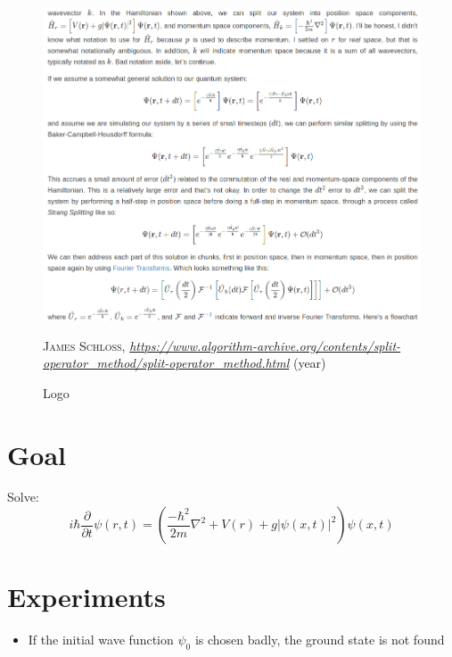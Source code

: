 \begin{figure}[H]
    \centering
    \includegraphics[width=1.0\textwidth]{IMAGE/strang_splitting.png}\\
    \caption{Logo}
    \textsc{James Schloss},
    \emph{            \url{https://www.algorithm-archive.org/contents/split-operator_method/split-operator_method.html}
    } (year)
    \label{fig:strang_splitting}
\end{figure}

\section{Goal}
Solve:
    \begin{equation}
        i \hbar \frac{\partial}{\partial t} \psi(r,t) = \left(\frac{-\hbar^{2}}{2 m} \nabla^{2}
                                                        + V(r) + g |\psi(x,t)|^{2} \right) \psi(x,t)
    \end{equation}

\section{Experiments}
\begin{itemize}
    \item If the initial wave function $\psi_{0}$ is chosen badly, the ground state is not found
\end{itemize}
